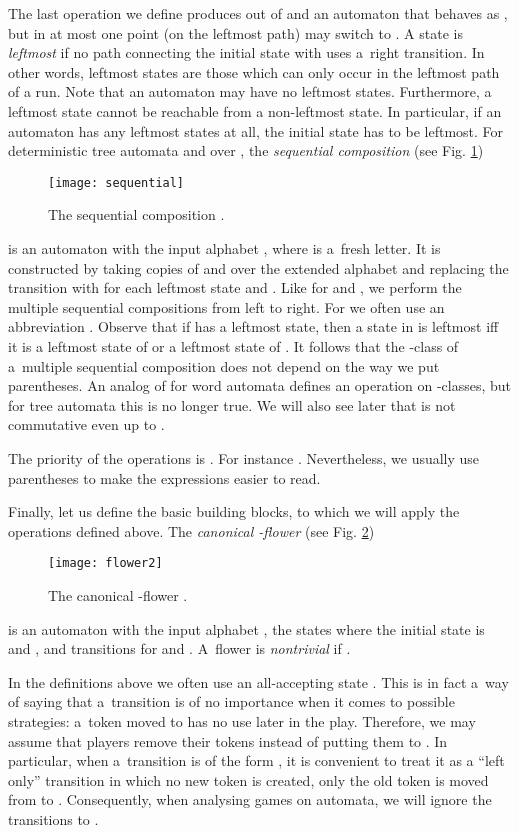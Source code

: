 \documentclass{LMCS}
\begin{document}
The last operation we define produces out of  and  an automaton that behaves as , but in at most one point (on the leftmost path) may switch to . A state  is {\em leftmost}  if no path connecting the initial state with  uses a~right transition. In other words, leftmost states are those which can only occur in the leftmost path of a run. Note that an automaton may have no leftmost states. Furthermore, a leftmost state cannot be reachable from a non-leftmost state. In particular, if an automaton has any leftmost states at all, the initial state has to be leftmost. For deterministic tree automata  and  over , the {\em sequential composition}  (see Fig. \ref{fig:sequential})  
\begin{figure}
\centering
\texttt{[image: sequential]}
\caption{The sequential composition .}
\label{fig:sequential}
\end{figure}
is an automaton with the input alphabet , where  is a~fresh letter. It is constructed by taking copies of  and  over the extended alphabet   and replacing the transition  with  for each leftmost state  and .  Like for  and , we perform the multiple sequential compositions from left to right. For  we often use an abbreviation .  Observe that if  has a leftmost state, then a state in  is leftmost iff it is a leftmost state of  or a leftmost state of . It follows that the -class of a~multiple sequential composition does not depend on the way we put parentheses. An analog of  for word automata defines an operation on -classes, but for tree automata this is no longer true. We will also see later that  is not commutative even up to .

The priority of the operations is . For instance . Nevertheless, we usually use parentheses to make the expressions easier to read. 

Finally, let us define the basic building blocks, to which we will
apply the operations defined above. The {\em canonical -flower}  (see Fig. \ref{fig:flower2})
\begin{figure}
\centering
\texttt{[image: flower2]}
\caption{The canonical -flower .}
\label{fig:flower2}
\end{figure}
is an automaton with the input alphabet ,  the states  where the initial state is  and , and transitions  
for  and . A~flower  is {\em nontrivial} if  .


In the definitions above we often use an all-accepting state . This is in fact a~way of saying that a~transition is of no importance when it comes to possible strategies: a~token moved to  has no use later in the play. Therefore, we may assume that players remove their tokens instead of putting them to . In particular, when a~transition is of the form , it is convenient to treat it as a ``left only'' transition in which no new token is created, only the old token is moved from  to . Consequently, when analysing games on automata, we will ignore the transitions to .
\end{document}
